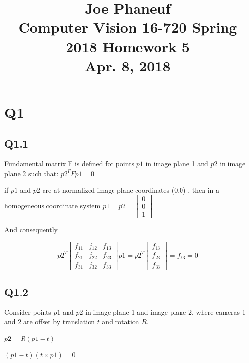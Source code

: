 \documentclass[12pt]{article}
\begin{document}
\title{Joe Phaneuf \\ Computer Vision 16-720 Spring 2018 Homework 5 \\ Apr. 8, 2018 }
\date{}
\author{}
\maketitle

\newpage


\section{Q1}
\subsection{Q1.1}
Fundamental matrix F is defined for points $p1$ in image plane 1 and $p2$ in image plane 2 such that:  
$p2^{T} F p1 = 0$  
  
if $p1$ and $p2$ are at normalized image plane coordinates (0,0) , then in a homogeneous coordinate system  
$ p1 = p2 = \begin{bmatrix} 0 \\ 0 \\ 1 \end{bmatrix}$   
  
And consequently  

$$
p2^{T}
\begin{bmatrix}
f_{11} & f_{12} & f_{13} \\
f_{21} & f_{22} & f_{23} \\
f_{31} & f_{32} & f_{33}
\end{bmatrix}
p1
=
p2^{T}
\begin{bmatrix}
f_{13} \\
f_{23} \\
f_{33}
\end{bmatrix}
=
f_{33}
=0
$$

\newpage
\subsection{Q1.2}
Consider points $p1$ and $p2$ in image plane 1 and image plane 2, where cameras 1 and 2 are offset by translation $t$ and rotation $R$.  
  
$p2 = R ( p1 - t)$  
  
$(p1 - t ) ( t \times p1 ) = 0$  
  
\end{document}
